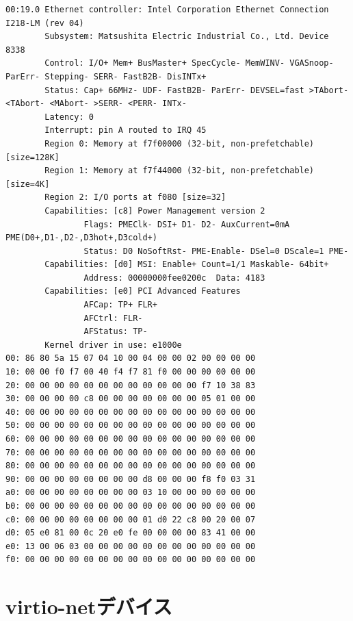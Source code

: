 \documentclass[a4paper,11pt,report]{ltjsbook}
\begin{document}
\small
\begin{verbatim}
00:19.0 Ethernet controller: Intel Corporation Ethernet Connection I218-LM (rev 04)
        Subsystem: Matsushita Electric Industrial Co., Ltd. Device 8338
        Control: I/O+ Mem+ BusMaster+ SpecCycle- MemWINV- VGASnoop- ParErr- Stepping- SERR- FastB2B- DisINTx+
        Status: Cap+ 66MHz- UDF- FastB2B- ParErr- DEVSEL=fast >TAbort- <TAbort- <MAbort- >SERR- <PERR- INTx-
        Latency: 0
        Interrupt: pin A routed to IRQ 45
        Region 0: Memory at f7f00000 (32-bit, non-prefetchable) [size=128K]
        Region 1: Memory at f7f44000 (32-bit, non-prefetchable) [size=4K]
        Region 2: I/O ports at f080 [size=32]
        Capabilities: [c8] Power Management version 2
                Flags: PMEClk- DSI+ D1- D2- AuxCurrent=0mA PME(D0+,D1-,D2-,D3hot+,D3cold+)
                Status: D0 NoSoftRst- PME-Enable- DSel=0 DScale=1 PME-
        Capabilities: [d0] MSI: Enable+ Count=1/1 Maskable- 64bit+
                Address: 00000000fee0200c  Data: 4183
        Capabilities: [e0] PCI Advanced Features
                AFCap: TP+ FLR+
                AFCtrl: FLR-
                AFStatus: TP-
        Kernel driver in use: e1000e
00: 86 80 5a 15 07 04 10 00 04 00 00 02 00 00 00 00
10: 00 00 f0 f7 00 40 f4 f7 81 f0 00 00 00 00 00 00
20: 00 00 00 00 00 00 00 00 00 00 00 00 f7 10 38 83
30: 00 00 00 00 c8 00 00 00 00 00 00 00 05 01 00 00
40: 00 00 00 00 00 00 00 00 00 00 00 00 00 00 00 00
50: 00 00 00 00 00 00 00 00 00 00 00 00 00 00 00 00
60: 00 00 00 00 00 00 00 00 00 00 00 00 00 00 00 00
70: 00 00 00 00 00 00 00 00 00 00 00 00 00 00 00 00
80: 00 00 00 00 00 00 00 00 00 00 00 00 00 00 00 00
90: 00 00 00 00 00 00 00 00 d8 00 00 00 f8 f0 03 31
a0: 00 00 00 00 00 00 00 00 03 10 00 00 00 00 00 00
b0: 00 00 00 00 00 00 00 00 00 00 00 00 00 00 00 00
c0: 00 00 00 00 00 00 00 00 01 d0 22 c8 00 20 00 07
d0: 05 e0 81 00 0c 20 e0 fe 00 00 00 00 83 41 00 00
e0: 13 00 06 03 00 00 00 00 00 00 00 00 00 00 00 00
f0: 00 00 00 00 00 00 00 00 00 00 00 00 00 00 00 00
\end{verbatim}


\section{virtio-netデバイス}
\begin{verbatim}
\end{verbatim}




\end{document}
